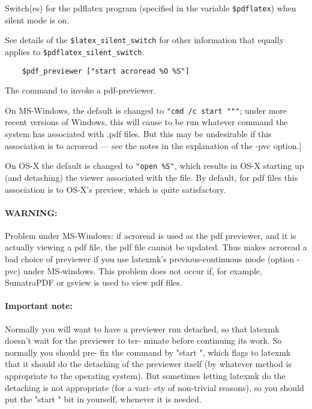 Switch(es)  for  the pdflatex program (specified in the variable
\verb|$pdflatex|) when silent mode is on.

See details of the \verb|$latex_silent_switch|  for  other  information
that equally applies to \verb|$pdflatex_silent_switch|.

\begin{verbatim}
	$pdf_previewer ["start acroread %O %S"]
\end{verbatim}

The command to invoke a pdf-previewer.

On  MS-Windows, the default is changed to \verb|"cmd /c start """|; under more
recent versions of Windows, this will cause to  be  run whatever command the
system has associated with .pdf files.  But this may be undesirable if this
association is  to  acroread  --- see the notes in the explanation of the -pvc
option.]

On  OS-X  the  default is changed to \verb|"open %S"|, which results in OS-X starting
up (and detaching) the viewer associated with  the file.   By  default, for pdf
files this association is to OS-X's preview, which is quite satisfactory.

\paragraph{WARNING:}

Problem under MS-Windows: if acroread is used  as  the pdf  previewer,  and  it
is actually viewing a pdf file, the pdf file cannot be updated.  Thus makes
acroread  a  bad  choice  of previewer  if you use latexmk's
previous-continuous mode (option -pvc) under MS-windows.  This problem does not
occur if, for example, SumatraPDF or gsview is used to view pdf files.

\paragraph{Important  note:}

Normally you will want to have a previewer run
detached, so that latexmk doesn't wait for the previewer to ter-
minate  before continuing its work.  So normally you should pre-
fix the command by "start ", which  flags  to  latexmk  that  it
should  do  the  detaching  of the previewer itself (by whatever
method is appropriate to the operating system).   But  sometimes
letting latexmk do the detaching is not appropriate (for a vari-
ety of non-trivial reasons), so you should put the "start "  bit
in yourself, whenever it is needed.

